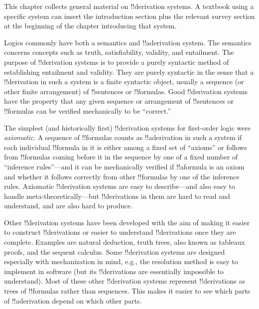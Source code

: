 
\begin{editorial}
This chapter collects general material on !!{derivation} systems. A
textbook using a specific system can insert the introduction section
plus the relevant survey section at the beginning of the chapter
introducing that system.
\end{editorial}





Logics commonly have both a semantics and !!a{derivation}
system. The semantics concerns concepts such as truth, satisfiability,
validity, and entailment.  The purpose of !!{derivation} systems is to
provide a purely syntactic method of establishing entailment and
validity.  They are purely syntactic in the sense that a
!!{derivation} in such a system is a finite syntactic object, usually
a sequence (or other finite arrangement) of !!{sentence}s or
!!{formula}s.  Good !!{derivation} systems have the property that any
given sequence or arrangement of !!{sentence}s or !!{formula}s can be
verified mechanically to be ``correct.''

The simplest (and historically first) !!{derivation} systems for
first-order logic were \emph{axiomatic}.  A sequence of !!{formula}s
counts as !!a{derivation} in such a system if each individual
!!{formula} in it is either among a fixed set of ``axioms'' or follows
from !!{formula}s coming before it in the sequence by one of a fixed
number of ``inference rules''---and it can be mechanically verified if
!!a{formula} is an axiom and whether it follows correctly from other
!!{formula}s by one of the inference rules.  Axiomatic !!{derivation}
systems are easy to describe---and also easy to handle
meta-theoretically---but !!{derivation}s in them are hard to read and
understand, and are also hard to produce.

Other !!{derivation} systems have been developed with the aim of
making it easier to construct !!{derivation}s or easier to understand
!!{derivation}s once they are complete.  Examples are natural
deduction, truth trees, also known as tableaux proofs, and the sequent
calculus.  Some !!{derivation} systems are designed especially with
mechanization in mind, e.g., the resolution method is easy to
implement in software (but its !!{derivation}s are essentially
impossible to understand). Most of these other !!{derivation} systems
represent !!{derivation}s as trees of !!{formula}s rather than
sequences. This makes it easier to see which parts of !!a{derivation}
depend on which other parts.

